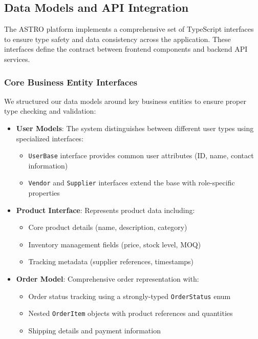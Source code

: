 \subsection{Data Models and API Integration}

The ASTRO platform implements a comprehensive set of TypeScript interfaces to ensure type safety and data consistency across the application. These interfaces define the contract between frontend components and backend API services.

\subsubsection{Core Business Entity Interfaces}

We structured our data models around key business entities to ensure proper type checking and validation:

\begin{itemize}
    \item \textbf{User Models}: The system distinguishes between different user types using specialized interfaces:
          \begin{itemize}
              \item \texttt{UserBase} interface provides common user attributes (ID, name, contact information)
              \item \texttt{Vendor} and \texttt{Supplier} interfaces extend the base with role-specific properties
          \end{itemize}

    \item \textbf{Product Interface}: Represents product data including:
          \begin{itemize}
              \item Core product details (name, description, category)
              \item Inventory management fields (price, stock level, MOQ)
              \item Tracking metadata (supplier references, timestamps)
          \end{itemize}

    \item \textbf{Order Model}: Comprehensive order representation with:
          \begin{itemize}
              \item Order status tracking using a strongly-typed \texttt{OrderStatus} enum
              \item Nested \texttt{OrderItem} objects with product references and quantities
              \item Shipping details and payment information
          \end{itemize}
\end{itemize}

